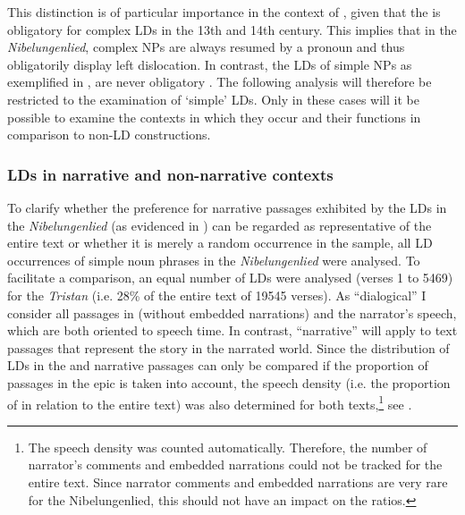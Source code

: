 \documentclass[output=paper,colorlinks,citecolor=brown]{langscibook}
\begin{document}
This distinction is of particular importance in the context of , given that the  is obligatory for complex LDs in the 13th and 14th century. This implies that in the \textit{Nibelungenlied}, complex NPs are always resumed by a pronoun and thus obligatorily display left dislocation. In contrast, the LDs of simple NPs as exemplified in , are never obligatory \citep[44]{Lötscher1994}. The following analysis will therefore be restricted to the examination of ‘simple' LDs. Only in these cases will it be possible to examine the contexts in which they occur and their functions in comparison to non-LD constructions.


\subsubsection{LDs in narrative and non-narrative contexts} \label{sec:zeman:3.1.2}
To clarify whether the preference for narrative passages exhibited by the LDs in the \textit{Nibelungenlied} (as evidenced in ) can be regarded as representative of the entire text or whether it is merely a random occurrence in the sample, all LD occurrences of simple noun phrases in the \textit{Nibelungenlied} were analysed. To facilitate a comparison, an equal number of LDs were analysed (verses 1 to 5469) for the \textit{Tristan} (i.e. 28\% of the entire text of 19545 verses). As “dialogical” I consider all passages in  (without embedded narrations) and the narrator's speech, which are both oriented to speech time. In contrast, “narrative” will apply to text passages that represent the story in the narrated world. Since the distribution of LDs in the  and narrative passages can only be compared if the proportion of  passages in the epic is taken into account, the speech density (i.e. the proportion of  in relation to the entire text) was also determined for both texts,\footnote{The speech density was counted automatically. Therefore, the number of narrator's comments and embedded narrations could not be tracked for the entire text. Since narrator comments and embedded narrations are very rare for the Nibelungenlied, this should not have an impact on the ratios.} see . 
\end{document}
